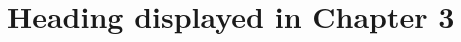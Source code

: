 \chapter[\leavevmode\newline Heading of Chapter 3 to show in TOC]{Heading displayed in  Chapter 3}
\label{chap:Chapter_3}
\lipsum[3]